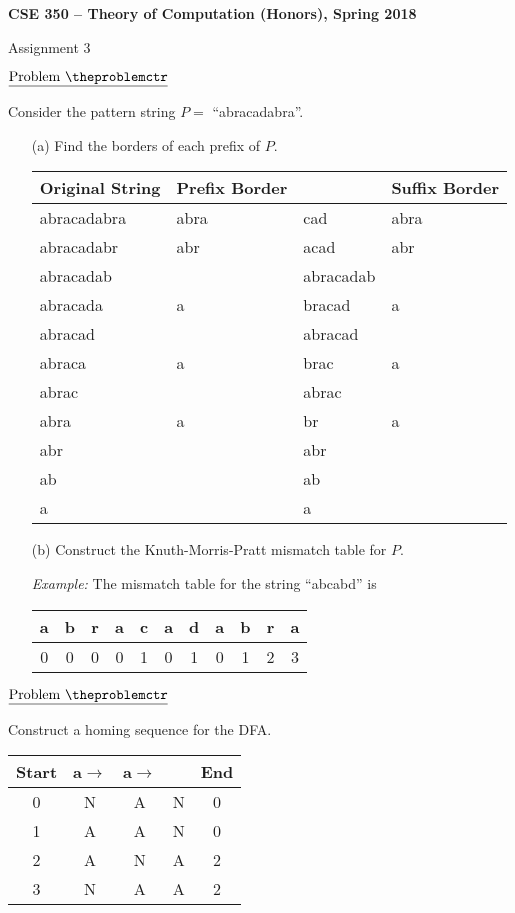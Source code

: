 \documentclass[11pt]{article}
\def\pp{\par\noindent}
\begin{document}
\centerline{\bf CSE 350 -- Theory of Computation (Honors), Spring 2018}
\medskip
\centerline{Assignment 3}


\addtocounter{problemctr}{1}

\noindent $\underline{\rm Problem\ \theproblemctr}$\pp

Consider the pattern string $P = $ ``abracadabra''.

\begin{enumerate}
  \item[(a)] Find the borders of each prefix of $P$.\\
    \begin{tabular}{|l|l|l|l|}
        \hline
        Original String & Prefix Border & & Suffix Border\\
        \hline
        abracadabra& abra & cad & abra \\
        \hline
        abracadabr& abr & acad &abr\\
        \hline
        abracadab& & abracadab& \\
        \hline
        abracada& a&bracad&a \\
        \hline
        abracad& & abracad & \\
        \hline
        abraca& a & brac & a \\
        \hline
        abrac& & abrac & \\
        \hline
        abra& a & br & a \\
        \hline
        abr& & abr & \\
        \hline
        ab& & ab & \\
        \hline
        a& & a & \\
        \hline
    \end{tabular}
    \bigskip
  \item[(b)]
    Construct the Knuth-Morris-Pratt mismatch table for $P$.

    {\it Example:} The mismatch table for the string ``abcabd'' is

    \begin{tabular}{|c c c c c c c c c c c|}
      \hline
      a&b&r&a&c&a&d&a&b&r&a\\
      \hline
      0&0&0&0&1&0&1&0&1&2&3\\
      \hline
    \end{tabular}
\end{enumerate}

\bigskip
\addtocounter{problemctr}{1}
\noindent $\underline{\rm Problem\ \theproblemctr}$\pp

Construct a homing sequence for the DFA.

\begin{tabular}{|c| c c c |c|}
    \hline
        Start & a$\rightarrow$ & a$\rightarrow$ &  & End\\
    \hline
        0 & N & A & N & 0\\
    \hline
        1 & A & A & N & 0\\
    \hline
        2 & A & N & A & 2\\
    \hline
        3 & N & A & A & 2\\
    \hline
\end{tabular}
\end{document}

